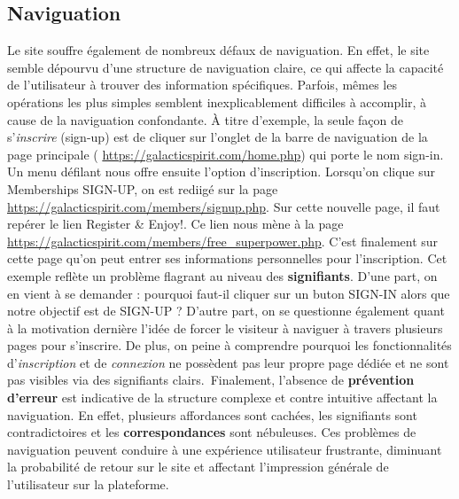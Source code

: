\documentclass[9pt]{report}
\newcommand{\mathpazott}{\fontfamily{pplj}\selectfont}
\renewcommand{\texttt}[1]{{\scriptsize\mathpazott #1}}
\begin{document}
\begin{multicols*}{2}
  \subsection{Naviguation}
  Le site souffre également de nombreux défaux de naviguation. En effet, le site 
  semble dépourvu d'une structure de naviguation claire, ce qui affecte la 
  capacité de l'utilisateur à trouver des information spécifiques. Parfois, 
  mêmes les opérations les plus simples semblent inexplicablement difficiles 
  à accomplir, à cause de la naviguation confondante. À titre d'exemple, 
  la seule façon de s'\textit{inscrire}   (\texttt{sign-up}) est de cliquer 
  sur l'onglet de la barre de naviguation de la page principale 
  (  \href{https://galacticspirit.com/home.php}{\texttt{https://galacticspirit.com/home.php}})
  qui porte le nom \texttt{sign-in}.  
  Un menu défilant nous offre ensuite l'option d'inscription. Lorsqu'on 
  clique sur \texttt{Memberships SIGN-UP}, on est rediigé sur la page 
  \href{https://galacticspirit.com/members/signup.php}{\texttt{https://galacticspirit.com/members/signup.php}}. Sur cette nouvelle page, il faut repérer le lien 
  \texttt{Register \& Enjoy!}. Ce lien nous mène à la page 
  \href{https://galacticspirit.com/members/free_superpower.php}{\texttt{https://galacticspirit.com/members/free\_superpower.php}}. C'est finalement sur cette page 
  qu'on peut entrer ses informations personnelles pour l'inscription. Cet exemple 
  reflète un problème flagrant au niveau des \textbf{signifiants}. D'une part, on en 
  vient à se demander : pourquoi faut-il cliquer sur un  buton 
  \texttt{SIGN-IN} alors que notre objectif est de \texttt{SIGN-UP} ? 
  D'autre part, on se questionne également quant 
  à la motivation dernière l'idée de forcer le visiteur à naviguer à travers plusieurs 
  pages pour s'inscrire. De plus, on peine à comprendre pourquoi 
  les fonctionnalités d'\textit{inscription} et de \textit{connexion} 
  ne possèdent pas 
  leur propre page dédiée et ne sont pas visibles via des signifiants clairs.\  Finalement, 
  l'absence de \textbf{prévention d'erreur} est indicative de la structure 
  complexe et contre intuitive affectant la naviguation. En effet, plusieurs 
  affordances sont cachées, les signifiants sont contradictoires et les 
  \textbf{correspondances} sont nébuleuses. 
  Ces problèmes de naviguation peuvent conduire à une expérience utilisateur frustrante, 
  diminuant la probabilité de retour sur le site et affectant l'impression générale de 
  l'utilisateur sur la plateforme.



\end{multicols*}
\end{document}
